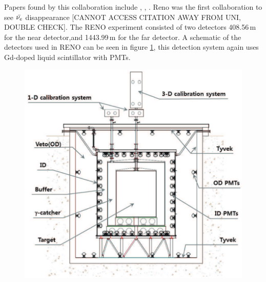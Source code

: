 Papers found by this collaboration include \cite{reno_may_2012}, \cite{reno2013},  \cite{reno_may_2019}. Reno was the first collaboration to see $\Bar{\nu_e}$ disappearance \cite{Olive_2014} [CANNOT ACCESS CITATION AWAY FROM UNI, DOUBLE CHECK]. The RENO experiment consisted of two detectors 408.56\,m for the near detector,and 1443.99\,m for the far detector. A schematic of the detectors used in RENO can be seen in figure \ref{RENO_detector}, this detection system again uses Gd-doped liquid scintillator with PMTs. 

\begin{figure}[htbp]
 \centering
 \includegraphics[width=0.5\linewidth]{Chapter2/Figs/Raster/RENO_detector.png} %
 \label{RENO_detector}
\end{figure}

